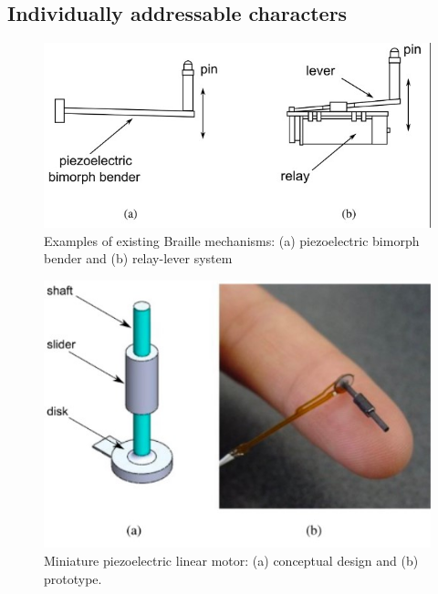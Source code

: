     \subsection{Individually addressable characters}
\begin{figure} \centering
    \includegraphics[width=\textwidth]{figures/piezo-bender_cut.jpg}
\caption{Examples of existing Braille mechanisms: (a) piezoelectric bimorph bender and (b) relay-lever system}
\label{fig:piezo-bender}
\end{figure}

\begin{figure} \centering
    \includegraphics[width=\textwidth]{figures/piezo-miniature.jpg}
\caption{ Miniature piezoelectric linear motor: (a) conceptual design and (b) prototype.}
\label{fig:piezo-miniature}
\end{figure}

